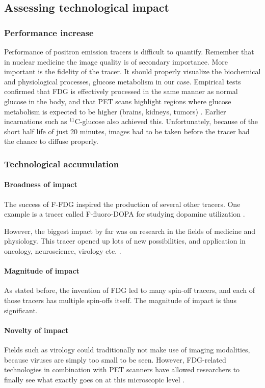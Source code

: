\subsection{Assessing technological impact}
\subsubsection{Performance increase}
Performance of positron emission tracers is difficult to quantify. Remember that
in nuclear medicine the image quality is of secondary importance. More important
is the fidelity of the tracer. It should properly visualize the biochemical and
physiological processes, glucose metabolism in our case. Empirical tests
confirmed that FDG is effectively processed in the same manner as normal glucose
in the body, and that PET scans highlight regions where glucose metabolism is
expected to be higher (brains, kidneys, tumors) \cite{radiopharma}. Earlier
incarnations such as $^{11}$C-glucose also achieved this. Unfortunately, because
of the short half life of just 20 minutes, images had to be taken before the
tracer had the chance to diffuse properly.

\subsubsection{Technological accumulation}
\paragraph{Broadness of impact}
The success of F-FDG inspired the production of several other tracers. One
example is a tracer called F-fluoro-DOPA for studying dopamine utilization
\cite{radiopharma}.

However, the biggest impact by far was on research in the fields of medicine and
physiology. This tracer opened up lots of new possibilities, and application in
oncology, neuroscience, virology etc. \cite{fdgresearch1, fdgresearch2}.

\paragraph{Magnitude of impact}
As stated before, the invention of FDG led to many spin-off tracers, and each of
those tracers has multiple spin-offs itself. The magnitude of impact is thus
significant.

\paragraph{Novelty of impact}
Fields such as virology could traditionally not make use of imaging modalities,
because viruses are simply too small to be seen. However, FDG-related
technologies in combination with PET scanners have allowed researchers to
finally see what exactly goes on at this microscopic level \cite{fdgresearch2}.

